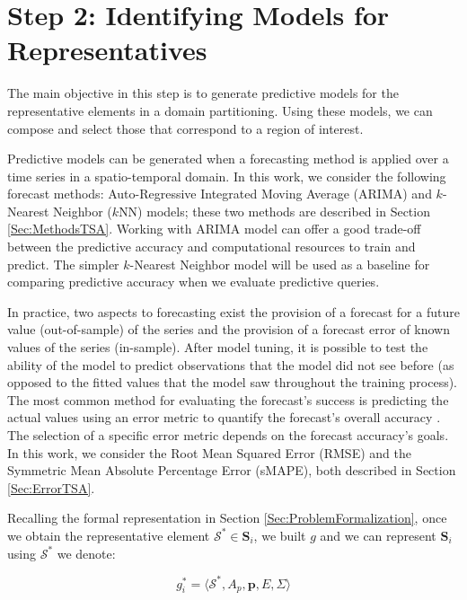 \section{Step 2: Identifying Models for Representatives}
\label{Sec:ModelRepresentatives}

The main objective in this step is to generate predictive models for the representative elements in a domain partitioning. Using these models, we can compose and select those that correspond to a region of interest.

Predictive models can be generated when a forecasting method is applied over a time series in a spatio-temporal domain. In this work, we consider the following forecast methods: Auto-Regressive Integrated Moving Average (ARIMA) and $k$-Nearest Neighbor ($k$NN) models; these two methods are described in Section \ref{Sec:MethodsTSA}. Working with ARIMA model can offer a good trade-off between the predictive accuracy and computational resources to train and predict. The simpler $k$-Nearest Neighbor model will be used as a baseline for comparing predictive accuracy when we evaluate predictive queries.

In practice, two aspects to forecasting exist the provision of a forecast for a future value (out-of-sample) of the series and the provision of a forecast error of known values of the series (in-sample). After model tuning, it is possible to test the ability of the model to predict observations that the model did not see before (as opposed to the fitted values that the model saw throughout the training process). The most common method for evaluating the forecast's success is predicting the actual values using an error metric to quantify the forecast's overall accuracy \cite{Hyndman2006}. The selection of a specific error metric depends on the forecast accuracy's goals. In this work, we consider the Root Mean Squared Error (RMSE) and the Symmetric Mean Absolute Percentage Error (sMAPE), both described in Section \ref{Sec:ErrorTSA}.

Recalling the formal representation in Section \ref{Sec:ProblemFormalization}, once we obtain the representative element $\mathcal{S}^{*} \in \mathbf{S}_{i}$, we built $g$ and we can represent $\mathbf{S}_{i}$ using $\mathcal{S}^{*}$ we denote:

\begin{equation}
g^{*}_{i} = \langle \mathcal{S}^{*}, A_p, \mathbf{p}, E, \varSigma \rangle
\end{equation}

